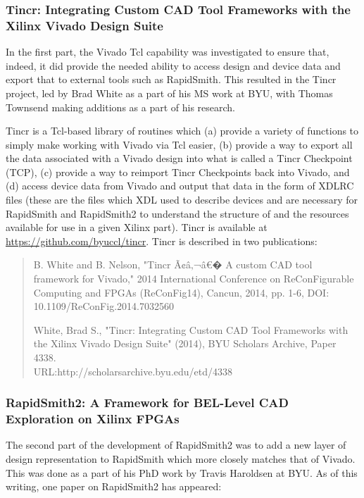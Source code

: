 \subsubsection{Tincr: Integrating Custom CAD Tool Frameworks with the Xilinx 
Vivado Design Suite} \label{sec:tincr}

In the first part, the Vivado Tcl capability was investigated to ensure that,
indeed, it did provide the needed ability to access design and device data and
export that to external tools such as RapidSmith.  This resulted in the Tincr
project, led by Brad White as a part of his MS work at BYU, with Thomas
Townsend making additions as a part of his research.

Tincr is a Tcl-based library of routines which (a) provide a variety of
functions to simply make working with Vivado via Tcl easier, (b) provide a way
to export all the data associated with a Vivado design into what is called a
Tincr Checkpoint (TCP), (c) provide a way to reimport Tincr Checkpoints back
into Vivado, and (d) access device data from Vivado and output that data in the
form of XDLRC files (these are the files which XDL used to describe devices and
are necessary for RapidSmith and RapidSmith2 to understand the structure of and the
resources available for use in a given Xilinx part).  Tincr is available at 
\href{https://github.com/byuccl/tincr}{\color{blue}https://github.com/byuccl/tincr}.
Tincr is described in two publications:

\begin{quotation}B. White and B. Nelson, "Tincr Ã¢â‚¬â€� A custom CAD tool framework
for Vivado," 2014 International Conference on ReConFigurable Computing and FPGAs (ReConFig14),
Cancun, 2014, pp. 1-6, DOI: 10.1109/ReConFig.2014.7032560

White, Brad S., "Tincr: Integrating Custom CAD Tool Frameworks with
the Xilinx Vivado Design Suite" (2014), BYU Scholars Archive, Paper 4338. 
\\URL:http://scholarsarchive.byu.edu/etd/4338
\end{quotation}

\subsubsection{RapidSmith2: A Framework for BEL-Level CAD Exploration on Xilinx FPGAs}
The second part of the development of RapidSmith2 was to add a new layer of design
representation to RapidSmith which more closely matches that of Vivado.  This
was done as a part of his PhD work by Travis Haroldsen at BYU.  As of this
writing, one paper on RapidSmith2 has appeared:

